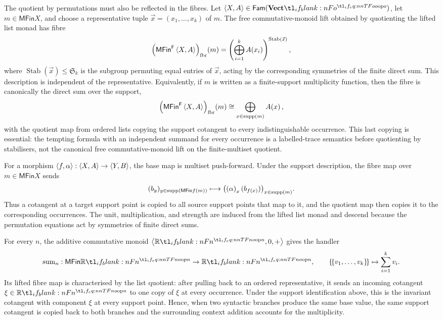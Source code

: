\documentclass[11pt,a4paper]{article}
\theoremstyle{definition}
\theoremstyle{remark}
\providecommand{\Fam}[1]{\mathsf{Fam}(#1)}
\providecommand{\fibr}[1]{\left(#1\right)_{\mathrm{fbr}}}
\providecommand{\MFin}{\mathsf{MFin}}
\begin{document}
The quotient by permutations must also be reflected in the fibres.  Let
\(\tuple{X,A}\in\Fam{\Vect[o]}\), let
\(m\in\MFin X\), and choose a representative tuple
\(\vec x=(x_1,\dots,x_k)\) of \(m\).  The free commutative-monoid lift obtained
by quotienting the lifted list monad has fibre
\begin{equation}
  \label{eq:appendix-multiset-fibre-stabiliser}
  \Fun[np]{\fibr{ \MFin^{\cat[]{F}}\tuple{X,A} }}{m}
  =
  \left(
    \bigoplus_{i=1}^{k}\Fun[nn]{A}{x_i}
  \right)^{\operatorname{Stab}(\vec x)},
\end{equation}
where \(\operatorname{Stab}(\vec x)\leq\mathfrak{S}_k\) is the subgroup
permuting equal entries of \(\vec x\), acting by the corresponding symmetries of
the finite direct sum.  This description is independent of the representative.
Equivalently, if \(m\) is written as a finite-support multiplicity function,
then the fibre is canonically the direct sum over the support,
\[
  \Fun[np]{\fibr{ \MFin^{\cat[]{F}}\tuple{X,A} }}{m}
  \cong
  \bigoplus_{x\in\operatorname{supp}(m)}\Fun[nn]{A}{x},
\]
with the quotient map from ordered lists copying the support cotangent to every
indistinguishable occurrence.  This last copying is essential: the tempting
formula with an independent summand for every occurrence is a labelled-trace
semantics before quotienting by stabilisers, not the canonical free
commutative-monoid lift on the finite-multiset quotient.

For a morphism \(\left\langle f,\alpha\right\rangle:\left\langle X,A\right\rangle\to\left\langle Y,B\right\rangle\), the base map is
multiset push-forward.  Under the support description, the fibre map over
\(m\in\MFin X\) sends
\[
  (b_y)_{y\in\operatorname{supp}(\MFin f(m))}
  \longmapsto
  \bigl(\Nat[nn]{\alpha}{x}(b_{f(x)})\bigr)_{x\in\operatorname{supp}(m)} .
\]
Thus a cotangent at a target support point is copied to all source support
points that map to it, and the quotient map then copies it to the corresponding
occurrences.  The unit, multiplication, and strength are induced from the lifted
list monad and descend because the permutation equations act by symmetries of
finite direct sums.

For every \(n\), the additive commutative monoid
\(\tuple{\R[n],0,+}\) gives the handler
\[
  \opn{sum}_{n}:\MFin\R[n]\to\R[n],
  \qquad
  \left\{\!\left\{v_{1},\dots,v_{k}\right\}\!\right\}\mapsto
  \sum_{i=1}^{k} v_i .
\]
Its lifted fibre map is characterised by the list quotient: after pulling back
to an ordered representative, it sends an incoming cotangent \(\xi\in\R[n]\) to
one copy of \(\xi\) at every occurrence.  Under the support identification
above, this is the invariant cotangent with component \(\xi\) at every support
point.  Hence, when two syntactic branches produce the same base value, the
same support cotangent is copied back to both branches and the surrounding
context addition accounts for the multiplicity.
\end{document}
